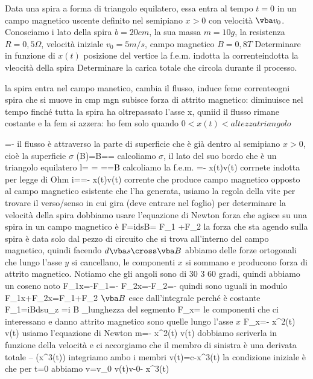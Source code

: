 \begin{eserciziamociwt}
	Data una spira a forma di triangolo equilatero, essa entra al tempo $t=0$ in un campo magnetico uscente definito nel semipiano $x>0$ con velocità $\vba v_0$.\\
	Conosciamo i lato della spira $b=20 cm$, la sua massa $m=10 g$, la resistenza $R=0,5 \Omega$, velocità iniziale $v_0=5 m/s$, campo magnetico $B=0,8 T$
	Determinare in funzione di $x(t)$ posizione del vertice
		la f.e.m. indotta
		la correnteindotta
		la vleocità della spira
	Determinare la carica totale che circola durante il processo.
\end{eserciziamociwt}
\begin{solution}
	la spira entra nel campo manetico, cambia il flusso, induce feme correnteogni spira che si muove in cmp mgn subisce forza di attrito magnetico: diminuisce nel tempo finché tutta la spira ha oltrepassato l'asse x, quniid il flusso rimane costante e la fem si azzera: ho fem solo quando $0<x(t)<altezza triangolo$
	
		\ee=-
	il flusso è attraverso la parte di superficie che è già dentro al semipiano $x>0$, cioè la superficie $\sigma$
		\Phi(\vba B)=B\sigma==
	calcoliamo $\sigma$, il lato del suo bordo che è un triangolo equilatero
		l=
		\sigma=
		==B
	calcoliamo la f.e.m.
		\ee=- x(t)v(t)
	corrnete indotta per legge di Ohm
		i==- x(t)v(t)
	corrente che produce campo magnetico opposto al campo magnetico esistente che l'ha generata, usiamo la regola della vite per trovare il verso/senso in cui gira (deve entrare nel foglio)
	per determinare la velocità della spira dobbiamo usare l'equazione di Newton
	forza che agisce su una spira in un campo magnetico è
		\vba F=i\int d\vba s\cross\vba B= \vba F_1 +\vba F_2
	la forza che sta agendo sulla spira è data solo dal pezzo di circuito che si trova all'interno del campo magnetico, quindi facendo $d\vba s\cross\vba B$ abbiamo delle forze ortogonali che lungo l'asse $y$ si cancellano, le componenti $x$ si sommano e producono forza di attrito magnetico. Notiamo che gli angoli sono di $30$ 3 $60$ gradi, quindi abbiamo un coseno noto
		F_{1x}=-F_1\cos\theta=-
		F_{2x}=-F_2\cos\theta=-
	quindi sono uguali in modulo
		F_{1x}+F_{2x}=F_1+F_2
	$\vba B$ esce dall'integrale perché è costante
		F_1=i\vba B\int d\vba s\cross \vbh u_z
		=i B _{lunghezza del segmento}
		F_x=
	le componenti che ci interessano e danno attrito magnetico sono quelle lungo l'asse $x$
		F_x=- x^2(t) v(t)
	usiamo l'equazione di Newton
		m=- x^2(t) v(t)
	dobbiamo scriverla in funzione della velocità e ci accorgiamo che il membro di sinistra è una derivata totale
		-- (x^3(t))
	integriamo ambo i membri
		v(t)=c-x^3(t)
	la condizione iniziale è che per t=0 abbiamo v=v_0
		v(t)v-0- x^3(t)
		

\end{solution}
